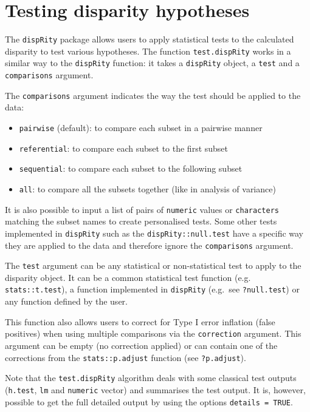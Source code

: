 \documentclass[]{book}
\providecommand{\tightlist}{%
  \setlength{\itemsep}{0pt}\setlength{\parskip}{0pt}}
\theoremstyle{definition}
\theoremstyle{definition}
\theoremstyle{remark}
\begin{document}
\section{Testing disparity
hypotheses}\label{testing-disparity-hypotheses}

The \texttt{dispRity} package allows users to apply statistical tests to
the calculated disparity to test various hypotheses. The function
\texttt{test.dispRity} works in a similar way to the \texttt{dispRity}
function: it takes a \texttt{dispRity} object, a \texttt{test} and a
\texttt{comparisons} argument.

The \texttt{comparisons} argument indicates the way the test should be
applied to the data:

\begin{itemize}
\tightlist
\item
  \texttt{pairwise} (default): to compare each subset in a pairwise
  manner
\item
  \texttt{referential}: to compare each subset to the first subset
\item
  \texttt{sequential}: to compare each subset to the following subset
\item
  \texttt{all}: to compare all the subsets together (like in analysis of
  variance)
\end{itemize}

It is also possible to input a list of pairs of \texttt{numeric} values
or \texttt{characters} matching the subset names to create personalised
tests. Some other tests implemented in \texttt{dispRity} such as the
\texttt{dispRity::null.test} have a specific way they are applied to the
data and therefore ignore the \texttt{comparisons} argument.

The \texttt{test} argument can be any statistical or non-statistical
test to apply to the disparity object. It can be a common statistical
test function (e.g. \texttt{stats::t.test}), a function implemented in
\texttt{dispRity} (e.g.~see \texttt{?null.test}) or any function defined
by the user.

This function also allows users to correct for Type I error inflation
(false positives) when using multiple comparisons via the
\texttt{correction} argument. This argument can be empty (no correction
applied) or can contain one of the corrections from the
\texttt{stats::p.adjust} function (see \texttt{?p.adjust}).

Note that the \texttt{test.dispRity} algorithm deals with some classical
test outputs (\texttt{h.test}, \texttt{lm} and \texttt{numeric} vector)
and summarises the test output. It is, however, possible to get the full
detailed output by using the options \texttt{details\ =\ TRUE}.
\end{document}
